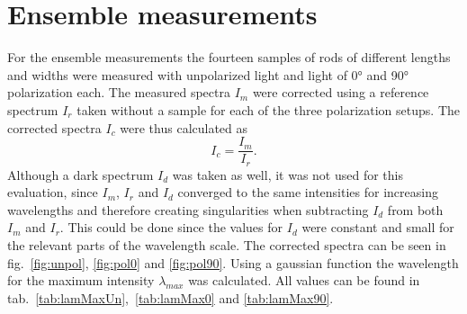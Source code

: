 
\section{Ensemble measurements}\label{sec:ensemble}

For the ensemble measurements the fourteen samples of rods of different lengths and widths were measured with unpolarized light and light of \ang{0} and \ang{90} polarization each. The measured spectra $I_m$ were corrected using a reference spectrum $I_r$ taken without a sample for each of the three polarization setups. The corrected spectra $I_c$ were thus calculated as
\begin{equation}
    I_c = \frac{I_m}{I_r}.
\end{equation}
Although a dark spectrum $I_d$ was taken as well, it was not used for this evaluation, since $I_m$, $I_r$ and $I_d$ converged to the same intensities for increasing wavelengths and therefore creating singularities when subtracting $I_d$ from both $I_m$ and $I_r$. This could be done since the values for $I_d$ were constant and small for the relevant parts of the wavelength scale. The corrected spectra can be seen in fig.~\ref{fig:unpol}, \ref{fig:pol0} and \ref{fig:pol90}. Using a gaussian function the wavelength for the maximum intensity $\lambda_{max}$ was calculated. All values can be found in tab.~\ref{tab:lamMaxUn},~\ref{tab:lamMax0} and \ref{tab:lamMax90}.

